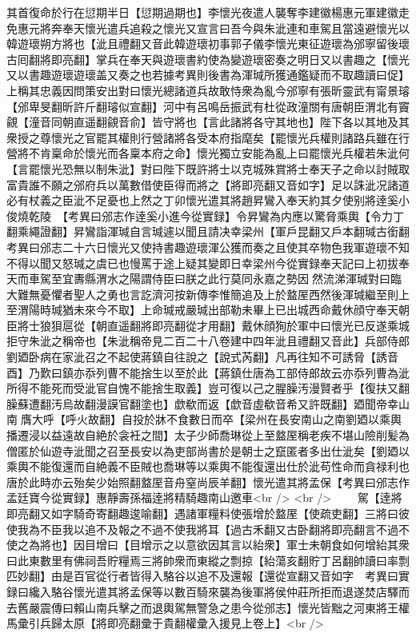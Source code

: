 其首復命於行在愆期半日【愆期過期也】李懷光夜遣人襲奪李建徽楊惠元軍建徽走免惠元將奔奉天懷光遣兵追殺之懷光又宣言曰吾今與朱泚連和車駕且當遠避懷光以韓遊瓌朔方將也【泚且禮翻又音此韓遊瓌初事郭子儀李懷光東征遊瓌為邠寧留後瓌古囘翻將即亮翻】掌兵在奉天與遊瓌書約使為變遊瓌密奏之明日又以書趣之【懷光又以書趣遊瓌遊瓌盖又奏之也若據考異則後書為渾瑊所獲通鑑疑而不取趣讀曰促】上稱其忠義因問策安出對曰懷光總諸道兵故敢恃衆為亂今邠寧有張昕靈武有甯景璿【邠卑旻翻昕許斤翻璿似宣翻】河中有呂鳴岳振武有杜從政潼關有唐朝臣渭北有竇覦【潼音同朝直遥翻覦音俞】皆守將也【言此諸將各守其地也】陛下各以其地及其衆授之尊懷光之官罷其權則行營諸將各受本府指麾矣【罷懷光兵權則諸路兵雖在行營將不肯稟命於懷光而各稟本府之命】懷光獨立安能為亂上曰罷懷光兵權若朱泚何【言罷懷光恐無以制朱泚】對曰陛下既許將士以克城殊賞將士奉天子之命以討賊取富貴誰不願之邠府兵以萬數借使臣得而將之【將即亮翻又音如字】足以誅泚况諸道必有杖義之臣泚不足憂也上然之丁卯懷光遣其將趙昇鸞入奉天約其夕使别將逹奚小俊燒乾陵　【考異曰邠志作逹奚小進今從實録】令昇鸞為内應以驚脅乘輿【令力丁翻乘繩證翻】昇鸞詣渾瑊自言瑊遽以聞且請决幸梁州【軍戶昆翻又戶本翻瑊古銜翻　考異曰邠志二十六日懷光又使持書趣遊瓌渾公獲而奏之且使其卒物色我軍遊瓌不知不得以聞又怒瑊之虞已也慢罵于途上疑其變即日幸梁州今從實録奉天記曰上初拔奉天而車駕至宜夀縣渭水之陽謂侍臣曰朕之此行莫同永嘉之勢因然流涕渾瑊對曰臨大難無憂懼者聖人之勇也言訖濟河按新傳李惟簡追及上於盩厔西然後渾瑊繼至則上至渭陽時瑊猶未來今不取】上命瑊戒嚴瑊出部勒未畢上已出城西命戴休顔守奉天朝臣將士狼狽扈從【朝直遥翻將即亮翻從才用翻】戴休顔狥於軍中曰懷光已反遂乘城拒守朱泚之稱帝也【朱泚稱帝見二百二十八卷建中四年泚且禮翻又音此】兵部侍郎劉廼卧病在家泚召之不起使蔣鎮自往說之【說式芮翻】凡再往知不可誘脅【誘音酉】乃歎曰鎮亦忝列曹不能捨生以至於此【蔣鎮仕唐為工部侍郎故云亦忝列曹為泚所得不能死而受泚官自愧不能捨生取義】豈可復以己之腥臊汚漫賢者乎【復扶又翻臊蘇遭翻汚烏故翻漫謨官翻塗也】歔欷而返【歔音虛欷音希又許既翻】廼聞帝幸山南膺大呼【呼火故翻】自投於牀不食數日而卒【梁州在長安南山之南劉廼以乘輿播遷浸以益遠故自絶於衾衽之間】太子少師喬琳從上至盩厔稱老疾不堪山險削髪為僧匿於仙遊寺泚聞之召至長安以為吏部尚書於是朝士之竄匿者多出仕泚矣【劉廼以乘輿不能復還而自絶義不臣賊也喬琳等以乘輿不能復還出仕於泚苟性命而貪禄利也唐於此時亦云殆矣少始照翻盩厔音舟窒尚辰羊翻】懷光遣其將孟保【考異曰邠志作孟廷寶今從實録】惠靜壽孫福逹將精騎趣南山邀車<br />
<br />
　　駕【逹將即亮翻又如字騎奇寄翻趣逡喻翻】遇諸軍糧料使張增於盩厔【使疏吏翻】三將曰彼使我為不臣我以追不及報之不過不使我將耳【過古禾翻又古卧翻將即亮翻言不過不使之為將也】因目增曰【目增示之以意欲因其言以紿衆】軍士未朝食如何增紿其衆曰此東數里有佛祠吾貯糧焉三將帥衆而東縱之剽掠【紿蕩亥翻貯丁呂翻帥讀曰率剽匹妙翻】由是百官從行者皆得入駱谷以追不及還報【還從宣翻又音如字　考異曰實録曰纔入駱谷懷光遣其將孟保等以數百騎來襲為後軍將侯仲莊所拒而退遂焚店驛而去舊嚴震傳曰賴山南兵擊之而退輿駕無警急之患今從邠志】懷光皆黜之河東將王權馬彚引兵歸太原【將即亮翻彚于貴翻權彚入援見上卷上】<br />
